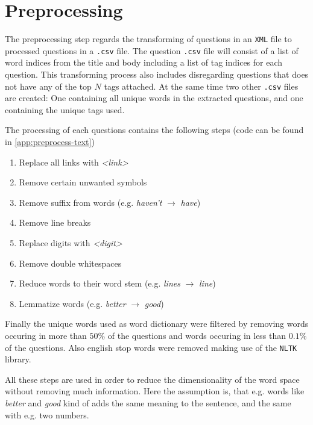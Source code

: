 
\section{Preprocessing}

The preprocessing step regards the transforming of questions in an \texttt{XML}
file to processed questions in a \texttt{.csv} file. The question \texttt{.csv}
file will consist of a list of word indices from the title and body including
a list of tag indices for each question.
This transforming process also includes disregarding questions that does not have
any of the top $N$ tags attached.
At the same time two other \texttt{.csv} files are created: One containing all
unique words in the extracted questions, and one containing the unique tags used.

The processing of each questions contains the following steps (code can be found
in \cref{app:preprocess-text})
\begin{enumerate}
  \item Replace all links with \textit{<link>}
  \item Remove certain unwanted symbols
  \item Remove suffix from words (e.g. \textit{haven't} $\rightarrow$ \textit{have})
  \item Remove line breaks
  \item Replace digits with \textit{<digit>}
  \item Remove double whitespaces
  \item Reduce words to their word stem (e.g. \textit{lines} $\rightarrow$ \textit{line})
  \item Lemmatize words (e.g. \textit{better} $\rightarrow$ \textit{good})
\end{enumerate}

Finally the unique words used as word dictionary were filtered by removing
words occuring in more than $50\%$ of the questions and words occuring in less
than $0.1\%$ of the questions. Also english stop words were removed making use
of the \texttt{NLTK} library.

All these steps are used in order to reduce the dimensionality of the word space
without removing much information. Here the assumption is, that e.g. words
like \textit{better} and \textit{good} kind of adds the same meaning to the
sentence, and the same with e.g. two numbers.
